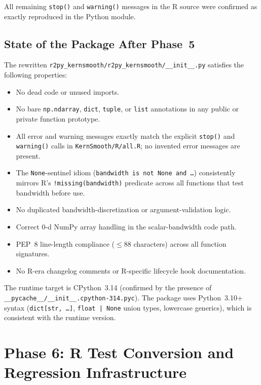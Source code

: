 \documentclass[12pt,a4paper]{article}
\begin{document}
All remaining \texttt{stop()} and \texttt{warning()} messages in the R source were confirmed as exactly reproduced in the Python module.

\subsection{State of the Package After Phase~5}

The rewritten \texttt{r2py\_kernsmooth/r2py\_kernsmooth/\_\_init\_\_.py} satisfies the following properties:

\begin{itemize}
  \item No dead code or unused imports.
  \item No bare \texttt{np.ndarray}, \texttt{dict}, \texttt{tuple}, or \texttt{list} annotations in any public or private function prototype.
  \item All error and warning messages exactly match the explicit \texttt{stop()} and \texttt{warning()} calls in \texttt{KernSmooth/R/all.R}; no invented error messages are present.
  \item The \texttt{None}-sentinel idiom (\texttt{bandwidth is not None and \ldots}) consistently mirrors R's \texttt{!missing(bandwidth)} predicate across all functions that test bandwidth before use.
  \item No duplicated bandwidth-discretization or argument-validation logic.
  \item Correct 0-d NumPy array handling in the scalar-bandwidth code path.
  \item PEP~8 line-length compliance ($\leq 88$ characters) across all function signatures.
  \item No R-era changelog comments or R-specific lifecycle hook documentation.
\end{itemize}

The runtime target is CPython~3.14 (confirmed by the presence of \texttt{\_\_pycache\_\_/\_\_init\_\_.cpython-314.pyc}). The package uses Python~3.10+ syntax (\texttt{dict[str,~\ldots]}, \texttt{float\,|\,None} union types, lowercase generics), which is consistent with the runtime version.

\section{Phase 6: R Test Conversion and Regression Infrastructure}
\end{document}
